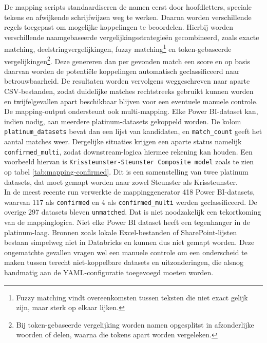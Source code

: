 De mapping scripts standaardiseren de namen eerst door hoofdletters, speciale tekens en afwijkende schrijfwijzen weg te werken. Daarna worden verschillende regels toegepast om mogelijke koppelingen te beoordelen. Hierbij worden verschillende naamgebaseerde vergelijkingsstrategieën gecombineerd, zoals exacte matching, deelstringvergelijkingen, fuzzy matching\footnote{Fuzzy matching vindt overeenkomsten tussen teksten die niet exact gelijk zijn, maar sterk op elkaar lijken.} en token-gebaseerde vergelijkingen\footnote{Bij token-gebaseerde vergelijking worden namen opgesplitst in afzonderlijke woorden of delen, waarna die tokens apart worden vergeleken.}. Deze genereren dan per gevonden match een score en op basis daarvan worden de potentiële koppelingen automatisch geclassificeerd naar betrouwbaarheid. De resultaten worden vervolgens weggeschreven naar aparte CSV-bestanden, zodat duidelijke matches rechtstreeks gebruikt kunnen worden en twijfelgevallen apart beschikbaar blijven voor een eventuele manuele controle.\\

De mapping-output ondersteunt ook multi-mapping. Elke Power BI-dataset kan, indien nodig, aan meerdere platinum-datasets gekoppeld worden. De kolom \texttt{platinum\_datasets} bevat dan een lijst van kandidaten, en \texttt{match\_count} geeft het aantal matches weer. Dergelijke situaties krijgen een aparte status namelijk \texttt{confirmed\_multi}, zodat downstream-logica hiermee rekening kan houden. Een voorbeeld hiervan is \texttt{Krissteunster-Steunster Composite model} zoals te zien op tabel \ref{tab:mapping-confirmed}. Dit is een samenstelling van twee platinum datasets, dat moet gemapt worden naar zowel Steunster als Krissteunster.\\

In de meest recente run verwerkte de mappinggenerator 418 Power BI-datasets, waarvan 117 als \texttt{confirmed} en 4 als \texttt{confirmed\_multi} werden geclassificeerd. De overige 297 datasets bleven \texttt{unmatched}. Dat is niet noodzakelijk een tekortkoming van de mappinglogica. Niet elke Power BI dataset heeft een tegenhanger in de platinum-laag. Bronnen zoals lokale Excel-bestanden of SharePoint-lijsten bestaan simpelweg niet in Databricks en kunnen dus niet gemapt worden. Deze ongematchte gevallen vragen wel een manuele controle om een onderscheid te maken tussen terecht niet-koppelbare datasets en uitzonderingen, die alsnog handmatig aan de YAML-configuratie toegevoegd moeten worden.\\

